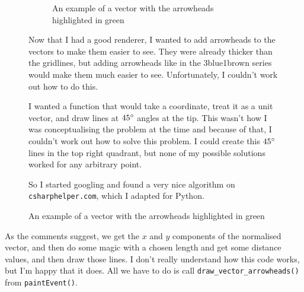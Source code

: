 \documentclass[../development.tex]{subfiles}
\begin{document}
\begin{figure}[H]
	\hspace{0.005\linewidth}
	\centering
	\begin{minipage}{0.40\linewidth}
		\centering
		\begin{figure}[H]
			\centering
			\caption{An example of a vector with the arrowheads highlighted in green}
			\label{tikz:development:improving-the-gui:adding-vector-arrowheads}
		\end{figure}
	\end{minipage}%
	\hspace{0.015\linewidth}
	\begin{minipage}{0.56\linewidth}\setspacing
		Now that I had a good renderer, I wanted to add arrowheads to the vectors to make them easier to see. They were already thicker than the gridlines, but adding arrowheads like in the 3blue1brown series would make them much easier to see. Unfortunately, I couldn't work out how to do this.

		I wanted a function that would take a coordinate, treat it as a unit vector, and draw lines at $45\degree$ angles at the tip. This wasn't how I was conceptualising the problem at the time and because of that, I couldn't work out how to solve this problem. I could create this $45\degree$ lines in the top right quadrant, but none of my possible solutions worked for any arbitrary point.

		So I started googling and found a very nice algorithm on \texttt{csharphelper.com}\cite{csharphelper-arrowheads}, which I adapted for Python.
	\end{minipage}
	\hspace{0.005\linewidth}
	\vspace{-1em}
\end{figure}


As the comments suggest, we get the $x$ and $y$ components of the normalised vector, and then do some magic with a chosen length and get some distance values, and then draw those lines. I don't really understand how this code works, but I'm happy that it does. All we have to do is call \texttt{draw\_vector\_arrowheads()} from \texttt{paintEvent()}.
\end{document}

